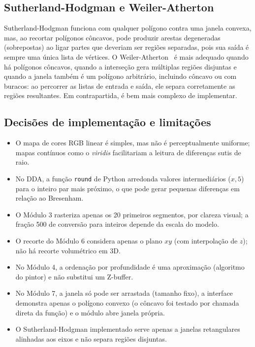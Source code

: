 \subsection{Sutherland-Hodgman e Weiler-Atherton}
Sutherland-Hodgman funciona com qualquer polígono contra uma janela convexa, mas, ao recortar polígonos côncavos, pode produzir arestas degeneradas (sobrepostas) ao ligar partes que deveriam ser regiões separadas, pois sua saída é sempre uma única lista de vértices. O Weiler-Atherton~\cite{weileratherton1977} é mais adequado quando há polígonos côncavos, quando a interseção gera múltiplas regiões disjuntas e quando a janela também é um polígono arbitrário, incluindo côncavo ou com buracos: ao percorrer as listas de entrada e saída, ele separa corretamente as regiões resultantes. Em contrapartida, é bem mais complexo de implementar.

\subsection{Decisões de implementação e limitações}
\begin{itemize}[leftmargin=*]
  \item O mapa de cores RGB linear é simples, mas não é perceptualmente uniforme; mapas contínuos como o \emph{viridis} facilitariam a leitura de diferenças sutis de raio.
  \item No DDA, a função \texttt{round} de Python arredonda valores intermediários ($x{,}5$) para o inteiro par mais próximo, o que pode gerar pequenas diferenças em relação ao Bresenham.
  \item O Módulo 3 rasteriza apenas os 20 primeiros segmentos, por clareza visual; a fração 500 de conversão para inteiros depende da escala do modelo.
  \item O recorte do Módulo 6 considera apenas o plano $xy$ (com interpolação de $z$); não há recorte volumétrico em 3D.
  \item No Módulo 4, a ordenação por profundidade é uma aproximação (algoritmo do pintor) e não substitui um Z-buffer.
  \item No Módulo 7, a janela só pode ser arrastada (tamanho fixo), a interface demonstra apenas o polígono convexo (o côncavo foi testado por chamada direta da função) e o módulo abre janela própria.
  \item O Sutherland-Hodgman implementado serve apenas a janelas retangulares alinhadas aos eixos e não separa regiões disjuntas.
\end{itemize}

